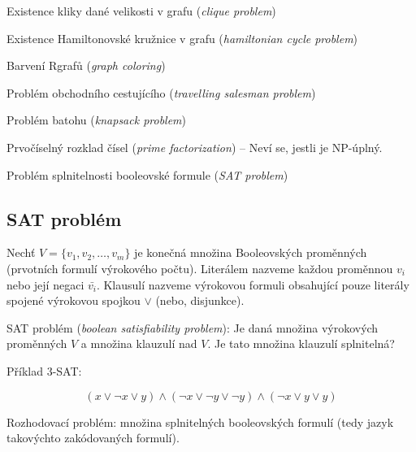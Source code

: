 \begin{compactitem}
    \item Existence kliky dané velikosti v grafu (\textit{clique problem})
    \item Existence Hamiltonovské kružnice v grafu (\textit{hamiltonian cycle problem})
    \item Barvení Rgrafů (\textit{graph coloring})
    \item Problém obchodního cestujícího (\textit{travelling salesman problem})
    \item Problém batohu (\textit{knapsack problem})
    \item Prvočíselný rozklad čísel (\textit{prime factorization}) -- Neví se, jestli je NP-úplný.
    \item Problém splnitelnosti booleovské formule (\textit{SAT problem})
\end{compactitem}

\subsection*{SAT problém}

\begin{compactitem}
    \item Nechť $V = \{ v_1, v_2, \dots, v_m \}$ je konečná množina Booleovských proměnných (prvotních formulí výrokového počtu). Literálem nazveme každou proměnnou $v_i$ nebo její negaci $\bar{v_i}$. Klausulí nazveme výrokovou formuli obsahující pouze literály spojené výrokovou spojkou $\lor$ (nebo, disjunkce).

    \item SAT problém (\textit{boolean satisfiability problem}): Je daná množina výrokových proměnných $V$ a množina klauzulí nad $V$. Je tato množina klauzulí splnitelná?

    \item Příklad 3-SAT:

    $$ (x \lor \neg x \lor y) \land (\neg x \lor \neg y \lor \neg y) \land (\neg x \lor y \lor y) $$

    \item Rozhodovací problém: množina splnitelných booleovských formulí (tedy jazyk takovýchto zakódovaných formulí).
\end{compactitem}
